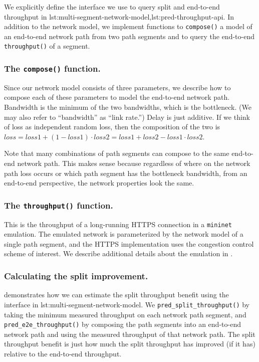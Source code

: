 We explicitly define the interface we
use to query split and end-to-end throughput in \Cref
{lst:multi-segment-network-model,lst:pred-throughput-api}. In addition
to the network model, we implement functions to \texttt{compose()} a model of
an end-to-end network path from two path segments and to
query the end-to-end \texttt{throughput()} of a segment.

\subsubsection{The \texttt{compose()} function.}
Since our network model consists of three parameters, we describe how to compose
each of these parameters to model the end-to-end network path. Bandwidth is the
minimum of the two bandwidths, which is the bottleneck.
(We may also refer to ``bandwidth'' as ``link rate.'')
Delay is just additive.
If we think of loss as independent random loss, then the composition
of the two is $loss = loss1 + (1-loss1)\cdot loss2 = loss1 + loss2 -
loss1 \cdot loss2$.

Note that many combinations of path segments can compose to the same end-to-end
network path. This makes sense because regardless of where on the network path
loss occurs or which path segment has the bottleneck bandwidth, from an
end-to-end perspective, the network properties look the same.

\subsubsection{The \texttt{throughput()} function.}
This is the throughput of a long-running HTTPS connection in a
\texttt{mininet} emulation. The emulated network is parameterized
by the network model of a single path segment, and the HTTPS implementation
uses the congestion control scheme of interest. We describe additional details
about the emulation in .

\subsubsection{Calculating the split improvement.}

 demonstrates how we can estimate the split
throughput benefit using the interface in \Cref
{lst:multi-segment-network-model}. We \texttt{pred\_split\_throughput()} by taking
the minimum measured throughput on each network path segment, and \texttt
{pred\_e2e\_throughput()} by composing the path segments into an end-to-end
network path and using the measured throughput of that network path. The split
throughput benefit is just how much the split throughput has improved (if it has)
relative to the end-to-end throughput.


